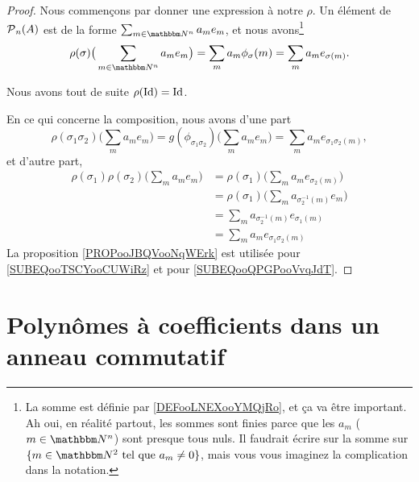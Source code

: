 \begin{proof}
    Nous commençons par donner une expression à notre \( \rho\). Un élément de \( \operatorname{\mathcal{P}}_n(A)\) est de la forme \( \sum_{m\in \eN^n}a_me_m\), et nous avons\footnote{La somme est définie par \ref{DEFooLNEXooYMQjRo}, et ça va être important. Ah oui, en réalité partout, les sommes sont finies parce que les \( a_m\) (\( m\in \eN^n\)) sont presque tous nuls. Il faudrait écrire sur la somme sur \(\{ m\in \eN^2\tq a_m\neq 0 \}\), mais vous vous imaginez la complication dans la notation.}
    \begin{equation}
        \rho(\sigma)\big( \sum_{m\in \eN^n}a_me_m \big)=\sum_ma_m\phi_{\sigma}(m)=\sum_ma_me_{\sigma(m)}.
    \end{equation}
    
    Nous avons tout de suite \( \rho(\operatorname{Id})=\operatorname{Id}\).

    En ce qui concerne la composition, nous avons d'une part
    \begin{equation}
        \rho(\sigma_1\sigma_2)\big( \sum_ma_me_m \big)=g(\phi_{\sigma_1\sigma_2})\big( \sum_ma_me_m \big)=\sum_ma_me_{\sigma_1\sigma_2(m)},
    \end{equation}
    et d'autre part,
    \begin{subequations}
        \begin{align}
            \rho(\sigma_1)\rho(\sigma_2)\big( \sum_ma_me_m \big)&=\rho(\sigma_1)\big( \sum_ma_me_{\sigma_2(m)} \big)\\
            &=\rho(\sigma_1)\big( \sum_ma_{\sigma_2^{-1}(m)}e_m \big)   \label{SUBEQooTSCYooCUWiRz}\\
            &=\sum_ma_{\sigma_2^{-1}(m)}e_{\sigma_1(m)}\\
            &=\sum_ma_me_{\sigma_1\sigma_2(m)}      \label{SUBEQooQPGPooVvqJdT}
        \end{align}
    \end{subequations}
    La proposition \ref{PROPooJBQVooNqWErk} est utilisée pour \eqref{SUBEQooTSCYooCUWiRz} et pour \eqref{SUBEQooQPGPooVvqJdT}.
\end{proof}

\section{Polynômes à coefficients dans un anneau commutatif}
\label{SECooVMABooVdhbPo}

